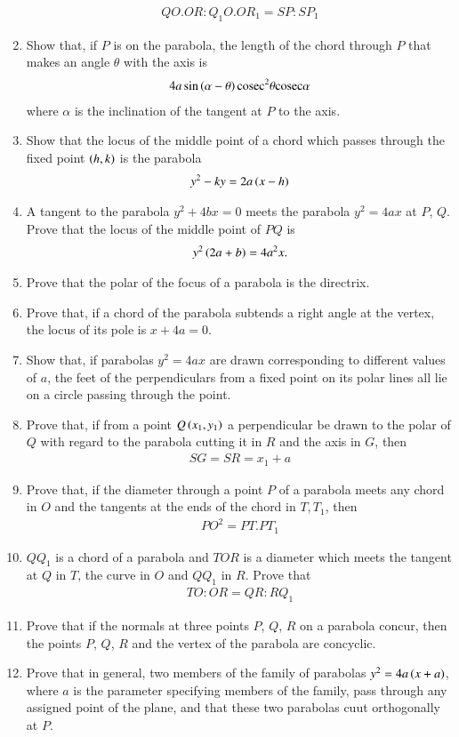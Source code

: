 \begin{enumerate}[1.]
\begin{align*}
QO.OR:Q_1O.OR_1=SP:SP_1
\end{align*}
\item Show that, if $P$ is on the parabola, the length of the chord through $P$ that makes an angle $\theta$ with the axis is
\begin{align*}
4a\sin\left(\alpha-\theta\right)\text{cosec}^2\theta\text{cosec}\alpha
\end{align*}
where $\alpha$ is the inclination of the tangent at $P$ to the axis.
\item Show that the locus of the middle point of a chord which passes through the fixed point $\left(h,k\right)$ is the parabola
\begin{align*}
y^2-ky = 2a\left(x-h\right)
\end{align*}
\item A tangent to the parabola $y^2+4bx=0$ meets the parabola $y^2=4ax$ at $P$, $Q$.  Prove that the locus of the middle point of $PQ$
is
\begin{align*}
y^2\left(2a+b\right)=4a^2x.
\end{align*}
\item Prove that the polar of the focus of a parabola is the directrix.
\item Prove that, if a chord of the parabola subtends a right angle at the vertex, the locus of its pole is $x+4a=0$.
\item Show that, if parabolas $y^2=4ax$ are drawn corresponding to different values of $a$, the feet of the perpendiculars
from a fixed point on its polar lines all lie on a circle passing through the point.
\item Prove that, if from a point $Q \left(x_1,y_1\right)$ a perpendicular be drawn to the polar
of $Q$ with regard to the parabola cutting it in $R$ and the axis in $G$, then
\begin{align*}
SG=SR=x_1+a
\end{align*}
\item Prove that, if the diameter through a point $P$ of a parabola meets any chord in $O$ and the tangents at the
ends of the chord in $T, T_1$, then
\begin{align*}
PO^2=PT.PT_1
\end{align*}
\item $QQ_1$ is a chord of a parabola and $TOR$ is a diameter which meets the tangent at $Q$ in $T$, the curve in $O$ and $QQ_1$ in $R$.  Prove
that 
\begin{align*}
TO:OR=QR:RQ_1
\end{align*}
\item Prove that if the normals at three points $P$, $Q$, $R$ on a parabola concur, then the points $P$, $Q$, $R$ and the vertex of
the parabola are concyclic.
\item Prove that in general, two members of the family of parabolas $y^2=4a\left(x+a\right)$, where $a$ is the parameter specifying members
of the family, pass through any assigned point of the plane, and that these two parabolas cuut orthogonally at $P$.
\end{enumerate}
